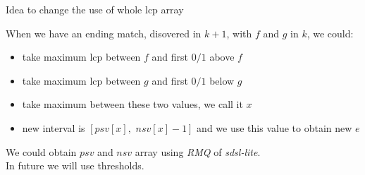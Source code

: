 \documentclass{beamer}
\begin{document}
\begin{frame}{Idea to change the use of whole lcp array}
  \begin{block}{}
    When we have an ending match, disovered in $k+1$, with $f$ and $g$ in $k$,
    we could: 
    \begin{itemize}
      \item take maximum lcp between $f$ and first $0/1$ above $f$
      \item take maximum lcp between $g$ and first $0/1$ below $g$
      \item take maximum between these two values, we call it $x$
      \item new interval is $[psv[x],\,\, nsv[x]-1]$ and we use this value to
      obtain new $e$
    \end{itemize}
  \end{block}
  \begin{alertblock}{}
    We could obtain $psv$ and $nsv$ array using \textit{RMQ} of
    \textit{sdsl-lite}. \\
    In future we will use thresholds.
  \end{alertblock}
\end{frame}
%   
%   
\end{document}
